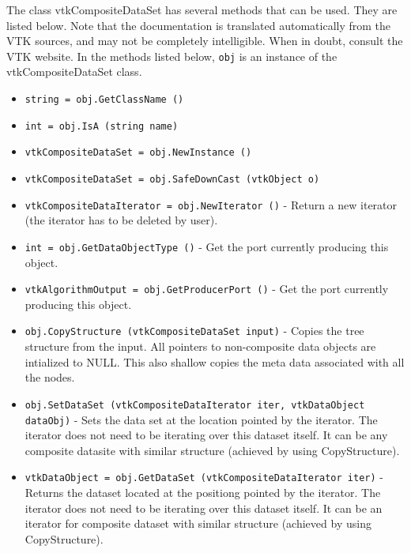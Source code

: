 The class vtkCompositeDataSet has several methods that can be used.
  They are listed below.
Note that the documentation is translated automatically from the VTK sources,
and may not be completely intelligible.  When in doubt, consult the VTK website.
In the methods listed below, \verb|obj| is an instance of the vtkCompositeDataSet class.
\begin{itemize}
\item  \verb|string = obj.GetClassName ()|

\item  \verb|int = obj.IsA (string name)|

\item  \verb|vtkCompositeDataSet = obj.NewInstance ()|

\item  \verb|vtkCompositeDataSet = obj.SafeDownCast (vtkObject o)|

\item  \verb|vtkCompositeDataIterator = obj.NewIterator ()| -  Return a new iterator (the iterator has to be deleted by user).

\item  \verb|int = obj.GetDataObjectType ()| -  Get the port currently producing this object.

\item  \verb|vtkAlgorithmOutput = obj.GetProducerPort ()| -  Get the port currently producing this object.

\item  \verb|obj.CopyStructure (vtkCompositeDataSet input)| -  Copies the tree structure from the input. All pointers to non-composite
 data objects are intialized to NULL. This also shallow copies the meta data
 associated with all the nodes.

\item  \verb|obj.SetDataSet (vtkCompositeDataIterator iter, vtkDataObject dataObj)| -  Sets the data set at the location pointed by the iterator.
 The iterator does not need to be iterating over this dataset itself. It can
 be any composite datasite with similar structure (achieved by using
 CopyStructure).

\item  \verb|vtkDataObject = obj.GetDataSet (vtkCompositeDataIterator iter)| -  Returns the dataset located at the positiong pointed by the iterator.
 The iterator does not need to be iterating over this dataset itself. It can
 be an iterator for composite dataset with similar structure (achieved by
 using CopyStructure).


\end{itemize}
